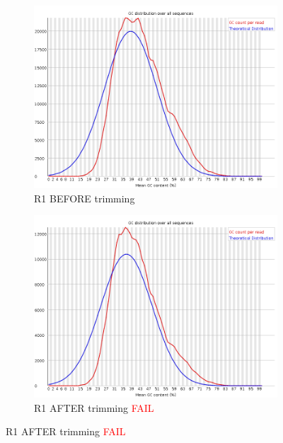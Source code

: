 \documentclass{article}
\begin{document}
\begin{figure}[!htb]
\caption{Per sequence GC content}
\centering
\begin{subfigure}{0.45\linewidth}
\vspace{5 mm}
\includegraphics[width=\linewidth]{04-D15-22373-HT-Nextera-Myeloid-Val1-Repeat_S4_L001_R1_001_fastqc/Images/per_sequence_gc_content.png}
\caption{R1 BEFORE trimming}
\end{subfigure}
\begin{subfigure}{0.45\linewidth}
\vspace{5 mm}
\includegraphics[width=\linewidth]{04-D15-22373-HT-Nextera-Myeloid-Val1-Repeat_S4_L001_R1_001.qfilter_fastqc/Images/per_sequence_gc_content.png}
\caption{R1 AFTER trimming \textcolor{red}{FAIL}}

\end{subfigure}
\end{figure}
\end{document}
